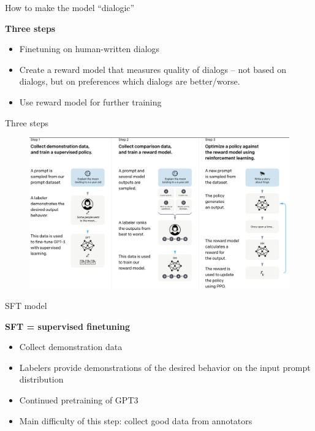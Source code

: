 \begin{vbframe}{How to make the model ``dialogic''}

\vfill

\textbf{Three steps}

	\begin{itemize}
		\item Finetuning on human-written dialogs
                \item Create a reward model that measures
		quality of dialogs -- not based on dialogs,
		but on preferences which dialogs are
		better/worse.
                \item Use reward model for further training
	\end{itemize}

\vfill

\end{vbframe}


\begin{vbframe}{Three steps}


\begin{figure}
\centering
\includegraphics[width = 12cm]{figure/threesteps.png}
\end{figure}


\end{vbframe}

\begin{vbframe}{SFT model}

\vfill

\textbf{SFT = supervised finetuning}

	\begin{itemize}
	\item Collect demonstration data
        \item Labelers provide demonstrations of the
          desired behavior on the input prompt distribution
\item Continued pretraining of GPT3
\item Main difficulty of this step: collect good data from annotators                  
	\end{itemize}

\vfill

\end{vbframe}

